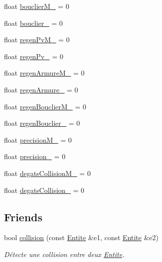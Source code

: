 \begin{DoxyCompactItemize}
\item 
float \mbox{\hyperlink{class_entite_ac6dc4d8af8bd8e9ca7e328d16d405b26}{bouclier\+M\+\_\+}} = 0
\item 
float \mbox{\hyperlink{class_entite_a933a79044c5ac6ffccd397c134248d44}{bouclier\+\_\+}} = 0
\item 
float \mbox{\hyperlink{class_entite_a66b44d5c567afa0434c26549c2727307}{regen\+Pv\+M\+\_\+}} = 0
\item 
float \mbox{\hyperlink{class_entite_a7c2872d20a5f134b5cfdf15e26e376e9}{regen\+Pv\+\_\+}} = 0
\item 
float \mbox{\hyperlink{class_entite_a3ef253a5134f4fa61be2fb6bca812855}{regen\+Armure\+M\+\_\+}} = 0
\item 
float \mbox{\hyperlink{class_entite_a8a2bbe199842916db0410c3ea6b4b080}{regen\+Armure\+\_\+}} = 0
\item 
float \mbox{\hyperlink{class_entite_a715631221f737aa571a6981a10e5c452}{regen\+Bouclier\+M\+\_\+}} = 0
\item 
float \mbox{\hyperlink{class_entite_a8eb7ea99af698268311f42338ebca836}{regen\+Bouclier\+\_\+}} = 0
\item 
float \mbox{\hyperlink{class_entite_ae04ca6e434ade85eacd22657d1ac0aa9}{precision\+M\+\_\+}} = 0
\item 
float \mbox{\hyperlink{class_entite_a1a1eb2e3f6f1a3e1b496797931796549}{precision\+\_\+}} = 0
\item 
float \mbox{\hyperlink{class_entite_a6a9a0f0446b254c811928b43d16da819}{degats\+Collision\+M\+\_\+}} = 0
\item 
float \mbox{\hyperlink{class_entite_a7b24bf48cb4546c953feb2c0576fdd02}{degats\+Collision\+\_\+}} = 0
\end{DoxyCompactItemize}
\subsection*{Friends}
\begin{DoxyCompactItemize}
\item 
bool \mbox{\hyperlink{class_entite_ac5011435e5099909dd34cd1750933b30}{collision}} (const \mbox{\hyperlink{class_entite}{Entite}} \&e1, const \mbox{\hyperlink{class_entite}{Entite}} \&e2)
\begin{DoxyCompactList}\small\item\em Détecte une collision entre deux \mbox{\hyperlink{class_entite}{Entite}}. \end{DoxyCompactList}\end{DoxyCompactItemize}


